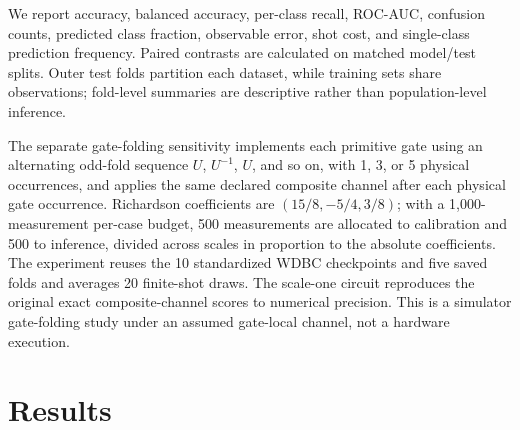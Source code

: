 \documentclass[conference]{IEEEtran}
\begin{document}
We report accuracy, balanced accuracy, per-class recall, ROC-AUC, confusion counts, predicted class fraction, observable error, shot cost, and single-class prediction frequency. Paired contrasts are calculated on matched model/test splits. Outer test folds partition each dataset, while training sets share observations; fold-level summaries are descriptive rather than population-level inference.

The separate gate-folding sensitivity implements each primitive gate using an alternating odd-fold sequence $U$, $U^{-1}$, $U$, and so on, with 1, 3, or 5 physical occurrences, and applies the same declared composite channel after each physical gate occurrence. Richardson coefficients are $(15/8,-5/4,3/8)$; with a 1,000-measurement per-case budget, 500 measurements are allocated to calibration and 500 to inference, divided across scales in proportion to the absolute coefficients. The experiment reuses the 10 standardized WDBC checkpoints and five saved folds and averages 20 finite-shot draws. The scale-one circuit reproduces the original exact composite-channel scores to numerical precision. This is a simulator gate-folding study under an assumed gate-local channel, not a hardware execution.

\section{Results}
\end{document}

